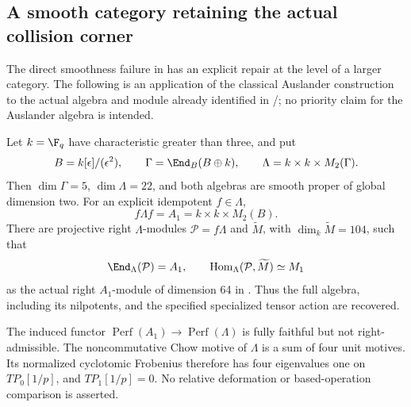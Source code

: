 \subsection{A smooth category retaining the actual collision corner}
The direct smoothness failure in  has an explicit repair
at the level of a larger category. The following is an application
of the classical Auslander construction to the actual algebra and
module already identified in /; no priority claim
for the Auslander algebra is intended.

\begin{finding}\label{f:auslander}
Let $k=\F_q$ have characteristic greater than three, and put
\[
 B=k[\epsilon]/(\epsilon^2),\qquad
 \Gamma=\End_B(B\oplus k),\qquad
 \Lambda=k\times k\times M_2(\Gamma).
\]
Then $\dim\Gamma=5$, $\dim\Lambda=22$, and both algebras are
smooth proper of global dimension two. For an explicit idempotent
$f\in\Lambda$,
\[
 f\Lambda f=A_1=k\times k\times M_2(B).
\]
There are projective right $\Lambda$-modules
$\mathcal P=f\Lambda$ and $\widetilde M$, with
$\dim_k\widetilde M=104$, such that
\[
 \End_\Lambda(\mathcal P)=A_1,\qquad
 \operatorname{Hom}_\Lambda(\mathcal P,\widetilde M)
   \simeq M_1
\]
as the actual right $A_1$-module of dimension 64 in .
Thus the full algebra, including its nilpotents, and the specified
specialized tensor action are recovered.

The induced functor
$\operatorname{Perf}(A_1)\to\operatorname{Perf}(\Lambda)$ is fully
faithful but not right-admissible. The noncommutative Chow motive
of $\Lambda$ is a sum of four unit motives. Its normalized
cyclotomic Frobenius therefore has four eigenvalues one on
$TP_0[1/p]$, and $TP_1[1/p]=0$.
No relative deformation or based-operation comparison is asserted.
\end{finding}

